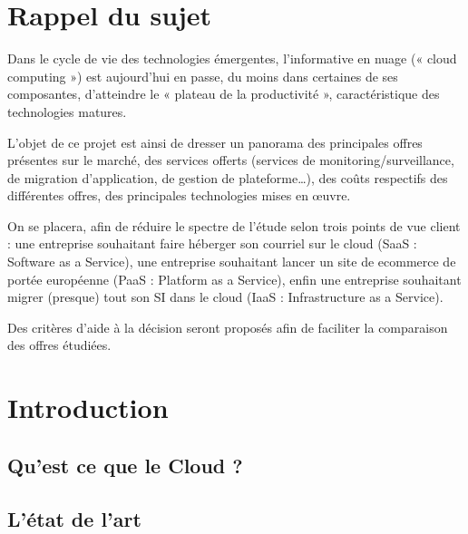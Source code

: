\documentclass[11pt]{book}
\begin{document}
\section{Rappel du sujet}\label{sec-rappel-du-sujet}%

\noindent{}Dans le cycle de vie des technologies émergentes, l’informative en nuage (« cloud computing ») est aujourd’hui en
passe, du moins dans certaines de ses composantes, d’atteindre le « plateau de la productivité », caractéristique des
technologies matures.%

L’objet de ce projet est ainsi de dresser un panorama des principales offres présentes sur le marché, des services
offerts (services de monitoring/surveillance, de migration d’application, de gestion de plateforme\dots{}), des coûts respectifs
des différentes offres, des principales technologies mises en œuvre.%

On se placera, afin de réduire le spectre de l’étude selon trois points de vue client : une entreprise souhaitant faire
héberger son courriel sur le cloud (SaaS : Software as a Service), une entreprise souhaitant lancer un site de ecommerce de portée européenne (PaaS : Platform as a Service), enfin une entreprise souhaitant migrer (presque) tout
son SI dans le cloud (IaaS : Infrastructure as a Service).%

Des critères d’aide à la décision seront proposés afin de faciliter la comparaison des offres étudiées.%

\section{Introduction}\label{sec-introduction}%

\subsection{Qu'est ce que le Cloud ?}\label{sec-quest-ce-que-le-cloud-}%

\subsection{L'état de l'art}\label{sec-ltat-de-lart}%
\end{document}
